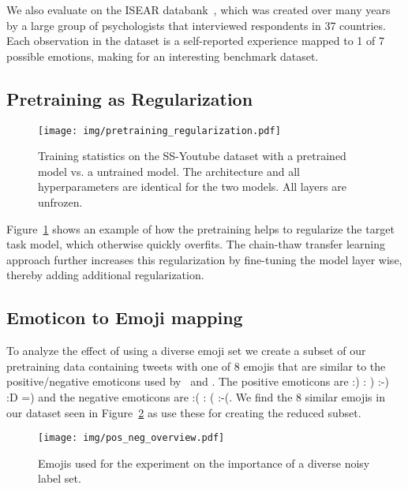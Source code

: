 \documentclass[11pt,a4paper]{article}
\begin{document}
We also evaluate on the ISEAR databank~\cite{wallbott1986universal}, which was created over many years by a large group of psychologists that interviewed respondents in 37 countries. Each observation in the dataset is a self-reported experience mapped to 1 of 7 possible emotions, making for an interesting benchmark dataset.


\subsection{Pretraining as Regularization}

\begin{figure}[hpt]
  \centering
  \texttt{[image: img/pretraining\_regularization.pdf]}
  \caption{Training statistics on the SS-Youtube dataset with a pretrained model vs. a untrained model. The architecture and all hyperparameters are identical for the two models. All layers are unfrozen.}
  \label{fig:pretraining_regularization}
\end{figure}

Figure~\ref{fig:pretraining_regularization} shows an example of how the pretraining helps to regularize the target task model, which otherwise quickly overfits. The chain-thaw transfer learning approach further increases this regularization by fine-tuning the model layer wise, thereby adding additional regularization.

\subsection{Emoticon to Emoji mapping}


To analyze the effect of using a diverse emoji set we create a subset of our pretraining data containing tweets with one of 8 emojis that are similar to the positive/negative emoticons used by~\citet{tang2014learning} and \citet{hu2013unsupervised}. The positive emoticons are :) : ) :-) :D =) and the negative emoticons are :( : ( :-(. We find the 8 similar emojis in our dataset seen in Figure~\ref{fig:pos_neg_overview} as use these for creating the reduced subset.

\begin{figure}[hpt]
  \centering
  \texttt{[image: img/pos\_neg\_overview.pdf]}
  \caption{Emojis used for the experiment on the importance of a diverse noisy label set.}
  \label{fig:pos_neg_overview}
\end{figure}
\end{document}

